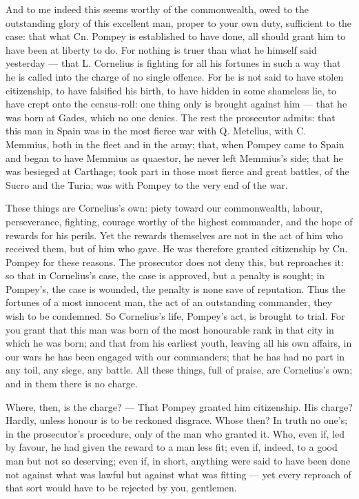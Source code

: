  And to me indeed this seems worthy of the commonwealth, owed to the outstanding glory of this excellent man, proper to your own duty, sufficient to the case: that what Cn. Pompey is established to have done, all should grant him to have been at liberty to do. For nothing is truer than what he himself said yesterday --- that L. Cornelius is fighting for all his fortunes in such a way that he is called into the charge of no single offence. For he is not said to have stolen citizenship, to have falsified his birth, to have hidden in some shameless lie, to have crept onto the census-roll: one thing only is brought against him --- that he was born at Gades, which no one denies. The rest the prosecutor admits: that this man in Spain was in the most fierce war with Q. Metellus, with C. Memmius, both in the fleet and in the army; that, when Pompey came to Spain and began to have Memmius as quaestor, he never left Memmius's side; that he was besieged at Carthage; took part in those most fierce and great battles, of the Sucro and the Turia; was with Pompey to the very end of the war.

 These things are Cornelius's own: piety toward our commonwealth, labour, perseverance, fighting, courage worthy of the highest commander, and the hope of rewards for his perils. Yet the rewards themselves are not in the act of him who received them, but of him who gave. He was therefore granted citizenship by Cn. Pompey for these reasons. The prosecutor does not deny this, but reproaches it: so that in Cornelius's case, the case is approved, but a penalty is sought; in Pompey's, the case is wounded, the penalty is none save of reputation. Thus the fortunes of a most innocent man, the act of an outstanding commander, they wish to be condemned. So Cornelius's life, Pompey's act, is brought to trial. For you grant that this man was born of the most honourable rank in that city in which he was born; and that from his earliest youth, leaving all his own affairs, in our wars he has been engaged with our commanders; that he has had no part in any toil, any siege, any battle. All these things, full of praise, are Cornelius's own; and in them there is no charge.

 Where, then, is the charge? --- That Pompey granted him citizenship. His charge? Hardly, unless honour is to be reckoned disgrace. Whose then? In truth no one's; in the prosecutor's procedure, only of the man who granted it. Who, even if, led by favour, he had given the reward to a man less fit; even if, indeed, to a good man but not so deserving; even if, in short, anything were said to have been done not against what was lawful but against what was fitting --- yet every reproach of that sort would have to be rejected by you, gentlemen.


